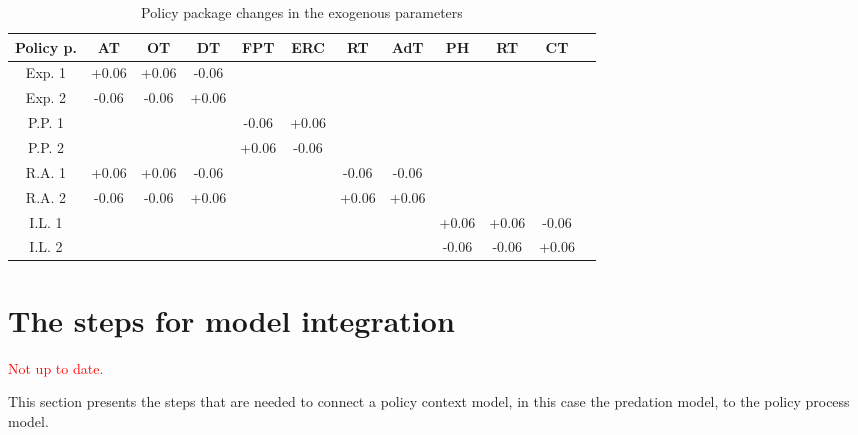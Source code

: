 \documentclass[12pt]{article}
\begin{document}
\begin{table}[h!]
\begin{center}
\begin{tabular}{ |c|c|c|c|c|c|c|c| c|c|c|c|}
 \hline

Policy p.		& AT		& OT		& DT		& FPT	& ERC	& RT		& AdT	& PH	 	& RT		& CT		\\ \hline \hline
Exp. 1		&+0.06	&+0.06	& -0.06	&		& 		& 		& 		& 		&		&		\\ \hline
Exp. 2		&-0.06	&-0.06	&+0.06	&		&		&		&		&		&		&		\\ \hline
P.P. 1		&		&		&		&-0.06	&+0.06	&		&		&		&		&		\\ \hline
P.P. 2		&		&		&		&+0.06	&-0.06	&		&		&		&		&		\\ \hline
R.A. 1		&+0.06	&+0.06	&-0.06	&		&		&-0.06	&-0.06	&		&		&		\\ \hline
R.A. 2		&-0.06	&-0.06	&+0.06	&		&		&+0.06	&+0.06	&		&		&		\\ \hline
I.L. 1			&		&		&		&		&		&		&		&+0.06	&+0.06	&-0.06	\\ \hline
I.L. 2			&		&		&		&		&		&		&		&-0.06	&-0.06	&+0.06	\\ \hline
\end{tabular}
\end{center}
\caption{Policy package changes in the exogenous parameters}
\label{tab:policyPackages}
\end{table}



\section{The steps for model integration}
\label{sec:steps}

\textcolor{red}{Not up to date.}

This section presents the steps that are needed to connect a policy context model, in this case the predation model, to the policy process model.
\end{document}

